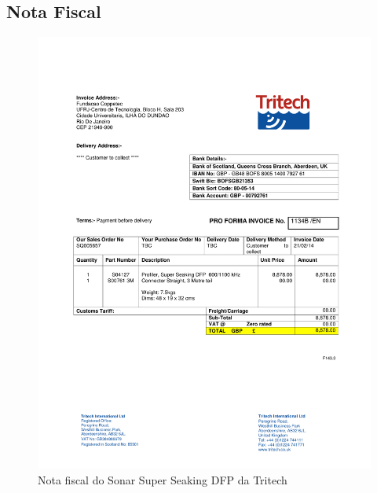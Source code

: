 \subsection{Nota Fiscal}
\begin{figure}[H]
 \centering
 \includegraphics[width=1\columnwidth]{Seaking_profiler/price_quote_0.pdf}
 \caption{Nota fiscal do Sonar Super Seaking DFP da Tritech}
\end{figure}


